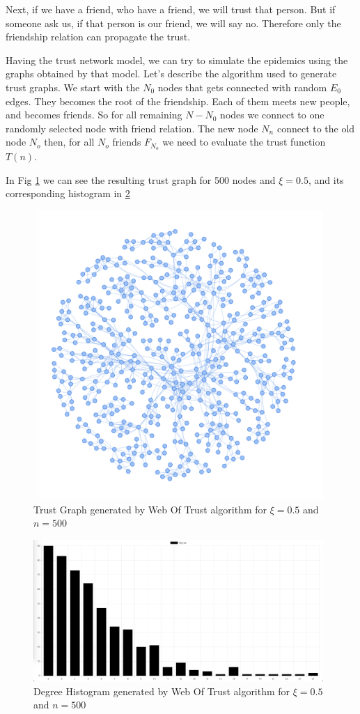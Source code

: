 \documentclass[nostrict]{szablonPG}
\begin{document}
Next, if we have a friend, who have a friend, we will trust that person. But if someone ask us, if that person is our friend, we will say no. Therefore only the friendship relation can propagate the trust.

Having the trust network model, we can try to simulate the epidemics using the graphs obtained by that model. Let's describe the algorithm used to generate trust graphs.
We start with the $N_0$ nodes that gets connected with random $E_0$ edges. They becomes the root of the friendship. Each of them meets new people, and becomes friends. So for all remaining $N - N_0$ nodes we connect to one randomly selected node with friend relation. The new node $N_n$ connect to the old node $N_o$ then, for all $N_o$ friends $F_{N_o}$ we need to evaluate the trust function $T(n)$.

In Fig \ref{fig:trustgraph500} we can see the resulting trust graph for 500 nodes and $\xi = 0.5$, and its corresponding histogram in \ref{fig:trustgraph500histogram}

\begin{figure}[h!]
    \includegraphics[width=11cm]{img/webOfTrust500Graph.png}
    \centering
    \caption{Trust Graph generated by Web Of Trust algorithm for $\xi=0.5$ and $n = 500$}
    \label{fig:trustgraph500}
\end{figure}

\begin{figure}[h!]
    \includegraphics[width=11cm]{img/webOfTrust500Hist.png}
    \centering
    \caption{Degree Histogram generated by Web Of Trust algorithm for $\xi=0.5$ and $n = 500$}
    \label{fig:trustgraph500histogram}
\end{figure} 
\end{document}
